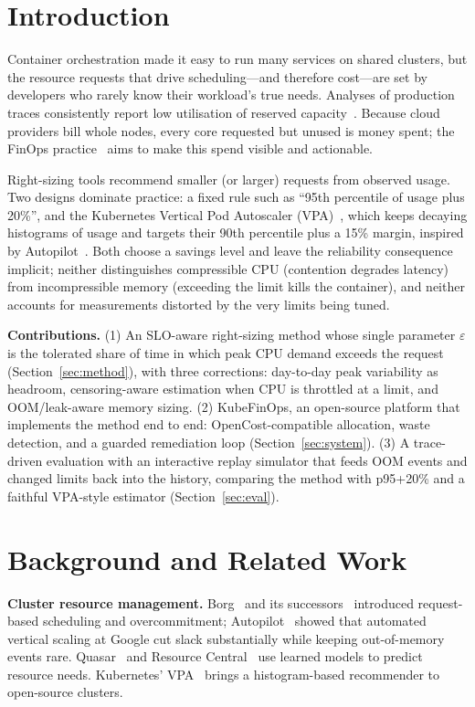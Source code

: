 \documentclass[conference]{IEEEtran}
\begin{document}
\section{Introduction}
Container orchestration made it easy to run many services on shared clusters, but the resource requests that
drive scheduling---and therefore cost---are set by developers who rarely know their workload's true needs.
Analyses of production traces consistently report low utilisation of reserved capacity~\cite{guo2019alibaba,
tirmazi2020borg,cortez2017resourcecentral}. Because cloud providers bill whole nodes, every core requested but
unused is money spent; the FinOps practice~\cite{finopsfoundation} aims to make this spend visible and actionable.

Right-sizing tools recommend smaller (or larger) requests from observed usage. Two designs dominate practice: a
fixed rule such as ``95th percentile of usage plus 20\%'', and the Kubernetes Vertical Pod Autoscaler
(VPA)~\cite{k8svpa}, which keeps decaying histograms of usage and targets their 90th percentile plus a 15\% margin,
inspired by Autopilot~\cite{rzadca2020autopilot}. Both choose a savings level and leave the reliability
consequence implicit; neither distinguishes compressible CPU (contention degrades latency) from incompressible
memory (exceeding the limit kills the container), and neither accounts for measurements distorted by the very
limits being tuned.

\textbf{Contributions.} (1) An SLO-aware right-sizing method whose single parameter $\varepsilon$ is the tolerated
share of time in which peak CPU demand exceeds the request (Section~\ref{sec:method}), with three corrections:
day-to-day peak variability as headroom, censoring-aware estimation when CPU is throttled at a limit, and
OOM/leak-aware memory sizing. (2) KubeFinOps, an open-source platform that implements the method end to end:
OpenCost-compatible allocation, waste detection, and a guarded remediation loop (Section~\ref{sec:system}).
(3) A trace-driven evaluation with an interactive replay simulator that feeds OOM events and changed limits back
into the history, comparing the method with p95+20\% and a faithful VPA-style estimator
(Section~\ref{sec:eval}).

\section{Background and Related Work}
\textbf{Cluster resource management.} Borg~\cite{verma2015borg} and its successors~\cite{burns2016borg} introduced
request-based scheduling and overcommitment; Autopilot~\cite{rzadca2020autopilot} showed that automated vertical
scaling at Google cut slack substantially while keeping out-of-memory events rare. Quasar~\cite{delimitrou2014quasar}
and Resource Central~\cite{cortez2017resourcecentral} use learned models to predict resource needs. Kubernetes'
VPA~\cite{k8svpa} brings a histogram-based recommender to open-source clusters.
\end{document}
